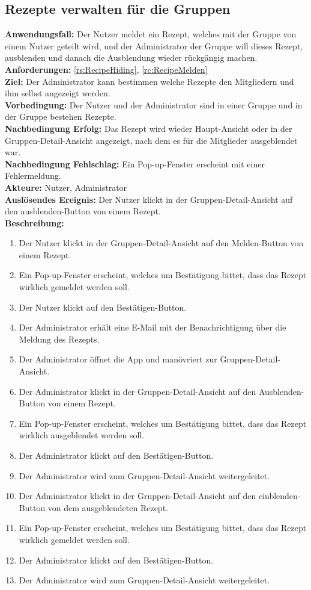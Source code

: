 \documentclass[parskip=full]{scrartcl}
\begin{document}
\subsection{Rezepte verwalten für die Gruppen}
\textbf{Anwendungsfall:} Der Nutzer meldet ein Rezept, welches mit der Gruppe von einem Nutzer geteilt wird, und der Administrator der Gruppe will dieses Rezept, ausblenden und danach die Ausblendung wieder rückgängig machen.\\
\textbf{Anforderungen:} \ref{rs:RecipeHiding}, \ref{rc:RecipeMelden}\\
\textbf{Ziel:} Der Administrator kann bestimmen welche Rezepte den Mitgliedern und ihm selbst angezeigt werden.\\
\textbf{Vorbedingung:} Der Nutzer und der Administrator sind in einer Gruppe und in der Gruppe bestehen Rezepte.\\
\textbf{Nachbedingung Erfolg:} Das Rezept wird wieder Haupt-Ansicht oder in der Gruppen-Detail-Ansicht angezeigt, nach dem es für die Mitglieder ausgeblendet war.\\
\textbf{Nachbedingung Fehlschlag:} Ein Pop-up-Fenster erscheint mit einer Fehlermeldung.\\
\textbf{Akteure:} Nutzer, Administrator  \\
\textbf{Auslösendes Ereignis:} Der Nutzer klickt in der Gruppen-Detail-Ansicht auf den ausblenden-Button von einem Rezept.\\
\textbf{Beschreibung:}
\begin{enumerate}
    \item Der Nutzer klickt in der Gruppen-Detail-Ansicht auf den Melden-Button von einem Rezept.
    \item Ein Pop-up-Fenster erscheint, welches um Bestätigung bittet, dass das Rezept wirklich gemeldet werden soll.
    \item Der Nutzer klickt auf den Bestätigen-Button.
    \item Der Administrator erhält eine E-Mail mit der Benachrichtigung über die Meldung des Rezepts.
    \item Der Administrator öffnet die App und manövriert zur Gruppen-Detail-Ansicht.
    \item Der Administrator klickt in der Gruppen-Detail-Ansicht auf den Ausblenden-Button von einem Rezept.
    \item Ein Pop-up-Fenster erscheint, welches um Bestätigung bittet, dass das Rezept wirklich ausgeblendet werden soll.
    \item Der Administrator klickt auf den Bestätigen-Button.
    \item Der Administrator wird zum Gruppen-Detail-Ansicht weitergeleitet.
    \item Der Administrator klickt in der Gruppen-Detail-Ansicht auf den einblenden-Button von dem ausgeblendeten Rezept.
    \item Ein Pop-up-Fenster erscheint, welches um Bestätigung bittet, dass das Rezept wirklich gemeldet werden soll.
    \item Der Administrator klickt auf den Bestätigen-Button.
    \item Der Administrator wird zum Gruppen-Detail-Ansicht weitergeleitet.
\end{enumerate}
\end{document}
